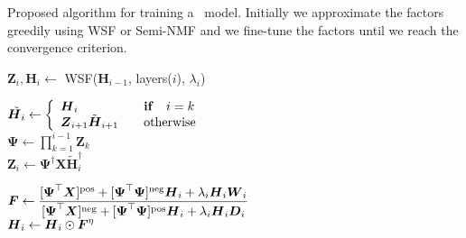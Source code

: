 \documentclass[10pt,journal,compsoc]{IEEEtran}
\begin{document}
\begin{algorithm}[tb]
\caption{Proposed algorithm for training a \dwsf~model. Initially we approximate the factors greedily using WSF or Semi-NMF and we fine-tune the factors until we reach the convergence criterion.}

\begin{algorithmic}
    \label{fig:apriori_deepnmfalgo}
        \STATE{}
            \STATE ${\boldsymbol Z}_i, {\boldsymbol H}_i \gets  $ {\sc WSF}(${\boldsymbol H}_{i-1}$, layers($i$), $\lambda_i$) 
        \ENDFOR

        \STATE{}

        \REPEAT
                \STATE
       $\tilde{{\boldsymbol H}_i} \gets \left\{
          \begin{array}{l l}
            {\boldsymbol H}_i           & \quad \text{\textbf{if}} \quad i = k \\
            {\boldsymbol Z}_{i+1} \tilde{\boldsymbol H}_{i+1} & \quad \text{otherwise}\\
          \end{array}\right.$ \\
       ${\boldsymbol \Psi} \gets  \prod_{k=1}^{i-1}{{\boldsymbol Z}_k}$ \\
       ${\boldsymbol Z}_i \gets {\boldsymbol \Psi}^{\dagger} {\boldsymbol X} \tilde{\boldsymbol H}_i^{\dagger}$ \\
   
       
       \newcommand{\hNum}{[{\boldsymbol \Psi}^{\top} {\boldsymbol X}]^{\text{pos}} + [{\boldsymbol \Psi}^{\top} {\boldsymbol \Psi}]^{\text{neg}} {\boldsymbol H}_i + \lambda_i \bs{H}_i \bs{W}_{i}}
       \newcommand{\hDenum}{[{\boldsymbol \Psi}^{\top} {\boldsymbol X}]^{\text{neg}} + [{\boldsymbol \Psi}^{\top} {\boldsymbol \Psi}]^{\text{pos}} {\boldsymbol H}_i + \lambda_i \bs{H}_i \bs{D}_i}
       
       $\bs{F} \gets \dfrac{\hNum}{\hDenum}$ \\
       
        ${\boldsymbol H}_i \gets  {\boldsymbol H}_i \odot \boldsymbol{F}^{\eta}$
            \ENDFOR
    \end{algorithmic}
\end{algorithm}
\end{document}
